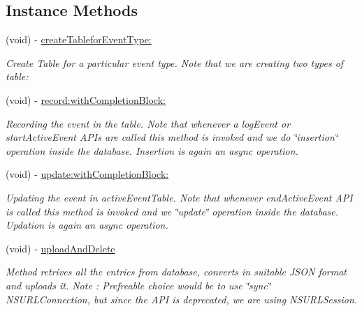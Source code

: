 \subsection*{Instance Methods}
\begin{DoxyCompactItemize}
\item 
(void) -\/ \hyperlink{interface_n_f_l_o_g_request_manager_a2c7a9f7fd9fb53d6a94a585274a6bc4f}{create\+Tablefor\+Event\+Type\+:}
\begin{DoxyCompactList}\small\item\em Create Table for a particular event type. Note that we are creating two types of table\+: \end{DoxyCompactList}\item 
\mbox{\label{interface_n_f_l_o_g_request_manager_a334b837987a00fcc1a88f0c8002a5916}} 
(void) -\/ \hyperlink{interface_n_f_l_o_g_request_manager_a334b837987a00fcc1a88f0c8002a5916}{record\+:with\+Completion\+Block\+:}
\begin{DoxyCompactList}\small\item\em Recording the event in the table. Note that whenever a log\+Event or start\+Active\+Event A\+P\+Is are called this method is invoked and we do \char`\"{}insertion\char`\"{} operation inside the database. Insertion is again an async operation. \end{DoxyCompactList}\item 
\mbox{\label{interface_n_f_l_o_g_request_manager_a99a0afcb8645e6dbfa96987c90ad6c1b}} 
(void) -\/ \hyperlink{interface_n_f_l_o_g_request_manager_a99a0afcb8645e6dbfa96987c90ad6c1b}{update\+:with\+Completion\+Block\+:}
\begin{DoxyCompactList}\small\item\em Updating the event in active\+Event\+Table. Note that whenever end\+Active\+Event A\+PI is called this method is invoked and we \char`\"{}update\char`\"{} operation inside the database. Updation is again an async operation. \end{DoxyCompactList}\item 
(void) -\/ \hyperlink{interface_n_f_l_o_g_request_manager_aa134b2591aa16f5577724d26e53b3eb5}{upload\+And\+Delete}
\begin{DoxyCompactList}\small\item\em Method retrives all the entries from database, converts in suitable J\+S\+ON format and uploads it. Note \+: Prefreable choice would be to use \char`\"{}sync\char`\"{} N\+S\+U\+R\+L\+Connection, but since the A\+PI is deprecated, we are using N\+S\+U\+R\+L\+Session. \end{DoxyCompactList}\item 

\end{DoxyCompactItemize}

